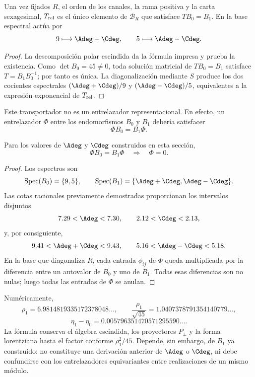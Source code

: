 \begin{proposition}
\label{p3-20260826:prop:transportador-relativo-split}
Una vez fijados \(R\), el orden de los canales, la rama positiva y la carta
sexagesimal, \(T_{\rm rel}\) es el único elemento de
\(\mathscr B_R\) que satisface \(TB_0=B_1\). En la base espectral actúa por
\[
 9\longmapsto\Adeg+\Cdeg,
 \qquad
 5\longmapsto\Adeg-\Cdeg.
\]
\end{proposition}

\begin{proof}
La descomposición polar escindida da la fórmula impresa y prueba la existencia.
Como \(\det B_0=45\ne0\), toda solución matricial de \(TB_0=B_1\) satisface
\(T=B_1B_0^{-1}\); por tanto es única. La diagonalización mediante \(S\)
produce los dos cocientes espectrales
\((\Adeg+\Cdeg)/9\) y \((\Adeg-\Cdeg)/5\), equivalentes a la expresión
exponencial de \(T_{\rm rel}\).
\end{proof}

Este transportador no es un entrelazador representacional. En efecto, un
entrelazador \(\Phi\) entre los endomorfismos \(B_0\) y \(B_1\) debería
satisfacer
\[
 \Phi B_0=B_1\Phi.
\]

\begin{theorem}
\label{p3-20260826:thm:no-go-entrelazador-bloques-split}
Para los valores de \(\Adeg\) y \(\Cdeg\) construidos en esta sección,
\[
 \boxed{\Phi B_0=B_1\Phi\quad\Longrightarrow\quad\Phi=0.}
\]
\end{theorem}

\begin{proof}
Los espectros son
\[
 \operatorname{Spec}(B_0)=\{9,5\},
 \qquad
 \operatorname{Spec}(B_1)
 =\{\Adeg+\Cdeg,\Adeg-\Cdeg\}.
\]
Las cotas racionales previamente demostradas proporcionan los intervalos
disjuntos
\[
 7.29<\Adeg<7.30,
 \qquad
 2.12<\Cdeg<2.13,
\]
y, por consiguiente,
\[
 9.41<\Adeg+\Cdeg<9.43,
 \qquad
 5.16<\Adeg-\Cdeg<5.18.
\]
En la base que diagonaliza \(R\), cada entrada \(\phi_{ij}\) de \(\Phi\)
queda multiplicada por la diferencia entre un autovalor de \(B_0\) y uno de
\(B_1\). Todas esas diferencias son no nulas; luego todas las entradas de
\(\Phi\) se anulan.
\end{proof}

Numéricamente,
\[
 \rho_1=6.9814819335172378048\ldots,
 \qquad
 \frac{\rho_1}{\sqrt{45}}=1.0407378791354140779\ldots,
\]
\[
 \eta_1-\eta_0
 =0.005796351470571295590\ldots.
\]
La fórmula conserva el álgebra escindida, los proyectores \(P_\pm\) y la forma
lorentziana hasta el factor conforme \(\rho_1^2/45\). Depende, sin embargo,
de \(B_1\) ya construido: no constituye una derivación anterior de
\(\Adeg\) o \(\Cdeg\), ni debe confundirse con los entrelazadores
equivariantes entre realizaciones de un mismo módulo.


